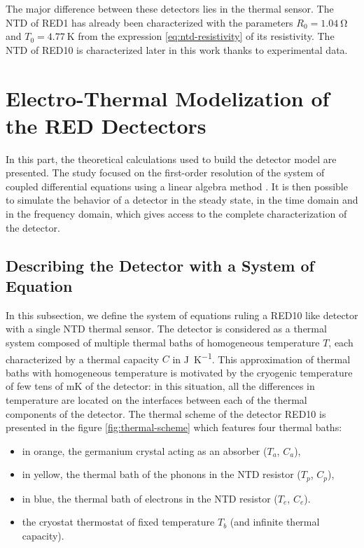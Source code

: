 The major difference between these detectors lies in the thermal sensor. The NTD of RED1 has already been characterized with the parameters $R_0 = \SI{1.04}{\ohm}$ and $T_0 = \SI{4.77}{\kelvin}$ from the expression \ref{eq:ntd-resistivity} of its resistivity.
The NTD of RED10 is characterized later in this work thanks to experimental data.

\section{Electro-Thermal Modelization of the RED Dectectors}
\label{sec:electro-thermal-model}

In this part, the theoretical calculations used to build the detector model are presented. The study focused on the first-order resolution of the system of coupled differential equations using a linear algebra method \cite{Figueroa:2006} \cite{Billard:2016apk}.
It is then possible to simulate the behavior of a detector in the steady state, in the time domain and in the frequency domain, which gives access to the complete characterization of the detector.

\subsection{Describing the Detector with a System of Equation}

In this subsection, we define the system of equations ruling a RED10 like detector with a single NTD thermal sensor. The detector is considered as a thermal system composed of multiple thermal baths of homogeneous temperature $T$, each characterized by a thermal capacity $C$ in \si{\joule\per\kelvin}.
This approximation of thermal baths with homogeneous temperature is motivated by the cryogenic temperature of few tens of \si{\milli\kelvin} of the detector: in this situation, all the differences in temperature are located on the interfaces between each of the thermal components of the detector.
The thermal scheme of the detector RED10 is presented in the figure \ref{fig:thermal-scheme} which features four thermal baths:
\begin{itemize}
\item in orange, the germanium crystal acting as an absorber ($T_a$, $C_a$),
\item in yellow, the thermal bath of the phonons in the NTD resistor ($T_p$, $C_p$),
\item in blue, the thermal bath of electrons in the NTD resistor ($T_e$, $C_e$).
\item the cryostat thermostat of fixed temperature $T_b$ (and infinite thermal capacity).
\end{itemize}

